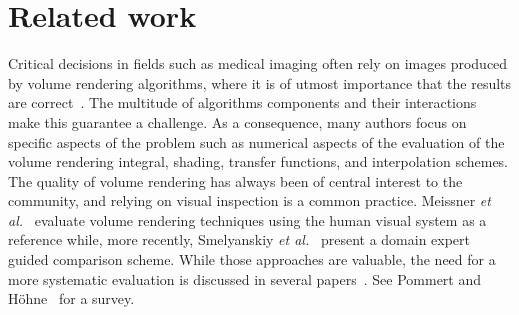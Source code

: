 


\section{Related work}
\label{sec:related-works}

Critical decisions in fields such as medical imaging often rely on
images produced by volume rendering algorithms, where it is of utmost
importance that the results are correct~\cite{Duncan2000}.  The
multitude of algorithms components and their interactions make
this guarantee a challenge. As a consequence, many authors focus on specific
aspects of the problem such as numerical aspects of the evaluation of
the volume rendering integral, shading, transfer functions, and
interpolation schemes.  The quality of volume rendering has always
been of central interest to the community, and relying on visual
inspection is a common practice. Meissner \emph{et
al.}~\cite{Meissner:2000:PEP:353888.353903} evaluate volume rendering
techniques using the human visual system as a reference while, more
recently, Smelyanskiy \emph{et
al.}~\cite{Smelyanskiy:2009:MHV:1638611.1639155} present a domain expert guided comparison scheme.
While those approaches are valuable, the need for a more systematic
evaluation is discussed in several
papers~\cite{globus95,Johnson:2004:TSV:1018014.1018051,Johnson:2003:NSV:942583.942610,kirby-vv-08}. See Pommert and
H\"{o}hne~\cite{Pommert2002,Pommert2003} for a survey.

